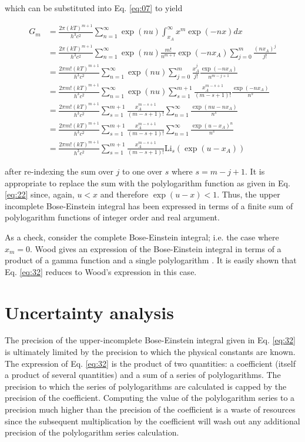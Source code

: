 \documentclass[aip,jap,reprint]{revtex4-1}
\newcommand{\Li}{\textrm{Li}}
\begin{document}
which can be substituted into Eq. \ref{eq:07} to yield

\begin{align} \label{eq:32}
G_{m} &= \frac{2\pi (kT)^{m+1}}{h^{3} c^{2}} \sum_{n = 1}^{\infty} \exp(nu) \int_{x_{A}}^{\infty} x^{m} \exp(-nx) dx \nonumber \\
 &= \frac{2\pi (kT)^{m+1}}{h^{3} c^{2}} \sum_{n = 1}^{\infty} \exp(nu) \frac{m!}{n^{m+1}} \exp(-n x_{A}) \sum_{j = 0}^{m} \frac{(n x_{A})^{j}}{j!} \nonumber \\
 &= \frac{2\pi m! (kT)^{m+1}}{h^{3} c^{2}} \sum_{n = 1}^{\infty} \exp(nu) \sum_{j = 0}^{m} \frac{x_{A}^{j}}{j!} \frac{\exp(-n x_{A})}{n^{m-j+1}} \nonumber \\
 &= \frac{2\pi m! (kT)^{m+1}}{h^{3} c^{2}} \sum_{n = 1}^{\infty} \exp(nu) \sum_{s = 1}^{m+1} \frac{x_{A}^{m-s+1}}{(m-s+1)!} \frac{\exp(-n x_{A})}{n^{s}} \nonumber \\
 &= \frac{2\pi m! (kT)^{m+1}}{h^{3} c^{2}} \sum_{s = 1}^{m+1} \frac{x_{A}^{m-s+1}}{(m-s+1)!} \sum_{n = 1}^{\infty} \frac{\exp(nu-n x_{A})}{n^{s}} \nonumber \\
 &= \frac{2\pi m! (kT)^{m+1}}{h^{3} c^{2}} \sum_{s = 1}^{m+1} \frac{x_{A}^{m-s+1}}{(m-s+1)!} \sum_{n = 1}^{\infty} \frac{\exp(u-x_{A})^{n}}{n^{s}} \nonumber \\
 &= \frac{2\pi m! (kT)^{m+1}}{h^{3} c^{2}} \sum_{s = 1}^{m+1} \frac{x_{A}^{m-s+1}}{(m-s+1)!} \Li_{s} \left( \exp(u-x_{A}) \right)
\end{align}

\noindent after re-indexing the sum over $j$ to one over $s$ where $s = m - j + 1$. It is appropriate to replace the sum with the polylogarithm function as given in Eq. \ref{eq:22} since, again, $u < x$ and therefore $\exp(u-x) < 1$. Thus, the upper incomplete Bose-Einstein integral has been expressed in terms of a finite sum of polylogarithm functions of integer order and real argument.

As a check, consider the complete Bose-Einstein integral; i.e. the case where $x_{m} = 0$. Wood gives an expression of the Bose-Einstein integral in terms of a product of a gamma function and a single polylogarithm \cite{60067317}. It is easily shown that Eq. \ref{eq:32} reduces to Wood's expression in this case.


\section{Uncertainty analysis}
The precision of the upper-incomplete Bose-Einstein integral given in Eq. \ref{eq:32} is ultimately limited by the precision to which the physical constants are known. The expression of Eq. \ref{eq:32} is the product of two quantities: a coefficient (itself a product of several quantities) and a sum of a series of polylogarithms. The precision to which the series of polylogarithms are calculated is capped by the precision of the coefficient. Computing the value of the polylogarithm series to a precision much higher than the precision of the coefficient is a waste of resources since the subsequent multiplication by the coefficient will wash out any additional precision of the polylogarithm series calculation.
\end{document}

